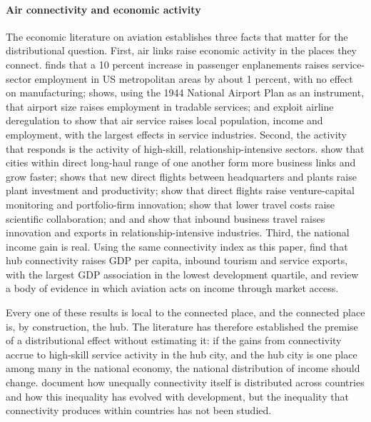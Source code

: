 \paragraph{Air connectivity and economic activity}
The economic literature on aviation establishes three facts that matter for the distributional question. First, air links raise economic activity in the places they connect. \citet{Brueckner_2003} finds that a 10 percent increase in passenger enplanements raises service-sector employment in US metropolitan areas by about 1 percent, with no effect on manufacturing; \citet{Sheard_2014} shows, using the 1944 National Airport Plan as an instrument, that airport size raises employment in tradable services; and \citet{Blonigen_2015} exploit airline deregulation to show that air service raises local population, income and employment, with the largest effects in service industries. Second, the activity that responds is the activity of high-skill, relationship-intensive sectors. \citet{Campante_2018} show that cities within direct long-haul range of one another form more business links and grow faster; \citet{Giroud_2013} shows that new direct flights between headquarters and plants raise plant investment and productivity; \citet{Bernstein_2016} show that direct flights raise venture-capital monitoring and portfolio-firm innovation; \citet{Catalini_2020} show that lower travel costs raise scientific collaboration; and \citet{Hovhannisyan_2015} and \citet{Cristea_2011} show that inbound business travel raises innovation and exports in relationship-intensive industries. Third, the national income gain is real. Using the same connectivity index as this paper, \citet{Yue_2026} find that hub connectivity raises GDP per capita, inbound tourism and service exports, with the largest GDP association in the lowest development quartile, and \citet{Lenaerts_2021} review a body of evidence in which aviation acts on income through market access.

Every one of these results is local to the connected place, and the connected place is, by construction, the hub. The literature has therefore established the premise of a distributional effect without estimating it: if the gains from connectivity accrue to high-skill service activity in the hub city, and the hub city is one place among many in the national economy, the national distribution of income should change. \citet{Sun_2024} document how unequally connectivity itself is distributed across countries and how this inequality has evolved with development, but the inequality that connectivity produces within countries has not been studied.

